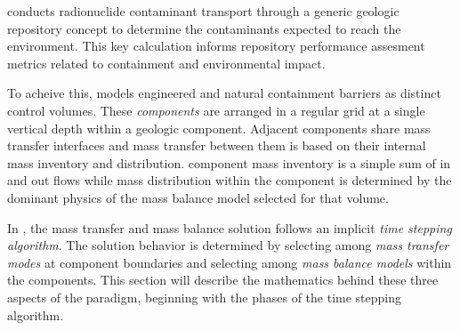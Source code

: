 \Cyder conducts radionuclide contaminant transport through a generic geologic 
repository concept to determine the 
contaminants expected to reach the environment. This key calculation 
informs repository performance assesment metrics related to containment and 
environmental impact.

To acheive this, \Cyder models engineered and natural containment barriers as 
distinct control volumes. These \emph{components} are arranged in a regular 
grid at a single vertical depth within a geologic component. Adjacent 
components share mass transfer interfaces and mass transfer between them is 
based on their internal mass inventory and distribution. component mass 
inventory is a simple sum of in and out flows while mass distribution within 
the component is determined by the dominant physics of the mass balance model 
selected for that volume.

In \Cyder, the mass transfer and mass balance solution follows an implicit 
\emph{time stepping algorithm}. The solution behavior is determined by selecting 
among \emph{mass transfer modes} at component boundaries and selecting among 
\emph{mass balance models} within the components. This section will describe 
the mathematics behind these three aspects of the \Cyder paradigm, beginning 
with the phases of the time stepping algorithm.
